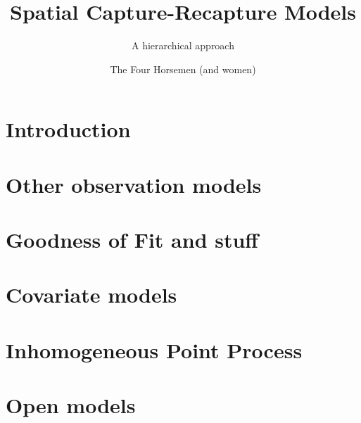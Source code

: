 \documentclass{book}
\begin{document}
\title{ Spatial Capture-Recapture Models }
\subtitle{ A hierarchical approach }
\author{The Four Horsemen (and women) }

\address{
USGS Patuxent Wildlife Research Center \\
North Carolina State University
}

\maketitle

\newpage

\setcounter{tocdepth}{2}
\tableofcontents

\chapter{Introduction}
\label{chapt.intro}







\chapter{Other observation models}
\label{chapt.poisson}

%





\chapter{Goodness of Fit and stuff}
\label{chapt.gof}



\chapter{Covariate models}
\label{chapt.covariates}



\chapter{Inhomogeneous Point Process}
\label{chapt.ipp}

\chapter{Open models}
\label{chapt.open}






\printindex


\end{document}
